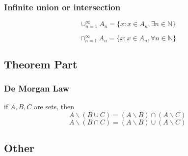 \documentclass{article}
\begin{document}
            \subsubsection{Infinite union or intersection}
                $$\cup _{n=1} ^{\infty} A_n=\{x:x\in A_n ,\exists n \in \mathbb{N} \}$$

                $$\cap _{n=1} ^{\infty} A_n=\{x:x\in A_n ,\forall n \in \mathbb{N} \}$$
        \subsection{Theorem Part}
            \subsubsection{De Morgan Law}
            if $A,B,C$ are sets, then
            $$A \backslash (B\cup C) = (A\backslash B)\cap (A\backslash C)$$
            $$A\backslash (B\cap C) = (A\backslash B)\cup (A\backslash C)$$

        \subsection{Other}
\end{document}
